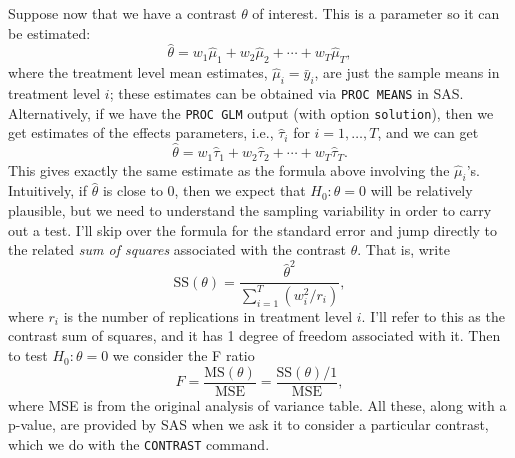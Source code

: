 \documentclass[a4paper, 12pt]{article}
\theoremstyle{plain}
\theoremstyle{definition}
\theoremstyle{remark}
\begin{document}
Suppose now that we have a contrast $\theta$ of interest.  This is a parameter so it can be estimated:
\[ \hat\theta = w_1 \hat\mu_1 + w_2 \hat\mu_2 + \cdots + w_T \hat\mu_T, \]
where the treatment level mean estimates, $\hat\mu_i=\bar y_i$, are just the sample means in treatment level $i$; these estimates can be obtained via {\tt PROC MEANS} in SAS.  Alternatively, if we have the {\tt PROC GLM} output (with option {\tt solution}), then we get estimates of the effects parameters, i.e., $\hat\tau_i$ for $i=1,\ldots,T$, and we can get 
\[ \hat\theta = w_1 \hat\tau_1 + w_2 \hat\tau_2 + \cdots + w_T \hat\tau_T. \]
This gives exactly the same estimate as the formula above involving the $\hat\mu_i$'s.  Intuitively, if $\hat\theta$ is close to 0, then we expect that $H_0: \theta=0$ will be relatively plausible, but we need to understand the sampling variability in order to carry out a test.  I'll skip over the formula for the standard error and jump directly to the related {\em sum of squares} associated with the contrast $\theta$.  That is, write 
\[ \text{SS}(\theta) = \frac{\hat\theta^2}{\sum_{i=1}^T (w_i^2/r_i)}, \]
where $r_i$ is the number of replications in treatment level $i$.  I'll refer to this as the contrast sum of squares, and it has 1 degree of freedom associated with it.  Then to test $H_0: \theta=0$ we consider the F ratio
\[ F = \frac{\text{MS}(\theta)}{\text{MSE}} = \frac{\text{SS}(\theta) / 1}{\text{MSE}}, \]
where MSE is from the original analysis of variance table.  All these, along with a p-value, are provided by SAS when we ask it to consider a particular contrast, which we do with the {\tt CONTRAST} command.  
\end{document}
